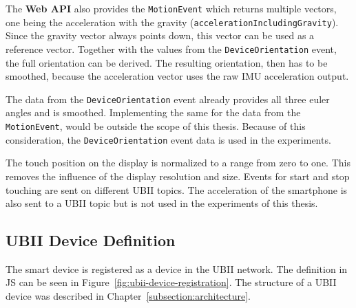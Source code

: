 The \textbf{Web API} also provides the \lstinline{MotionEvent} which returns multiple vectors, one being the acceleration with the gravity (\lstinline{accelerationIncludingGravity}). Since the gravity vector always points down, this vector can be used as a reference vector. Together with the values from the \lstinline{DeviceOrientation} event, the full orientation can be derived. The resulting orientation, then has to be smoothed, because the acceleration vector uses the raw \ac{IMU} acceleration output. %

The data from the \lstinline{DeviceOrientation} event already provides all three euler angles and is smoothed. Implementing the same for the data from the \lstinline{MotionEvent}, would be outside the scope of this thesis. Because of this consideration, the \lstinline{DeviceOrientation} event data is used in the experiments. %

The touch position on the display is normalized to a range from zero to one. This removes the influence of the display resolution and size. Events for start and stop touching are sent on different \ac{UBII} topics. The acceleration of the smartphone is also sent to a \ac{UBII} topic but is not used in the experiments of this thesis. %


\subsection{UBII Device Definition}\label{subsection:ubii-device-definition}

The smart device is registered as a device in the \ac{UBII} network. The definition in \ac{JS} can be seen in Figure~\ref{fig:ubii-device-registration}. The structure of a \ac{UBII} device was described in Chapter~\ref{subsection:architecture}. 

